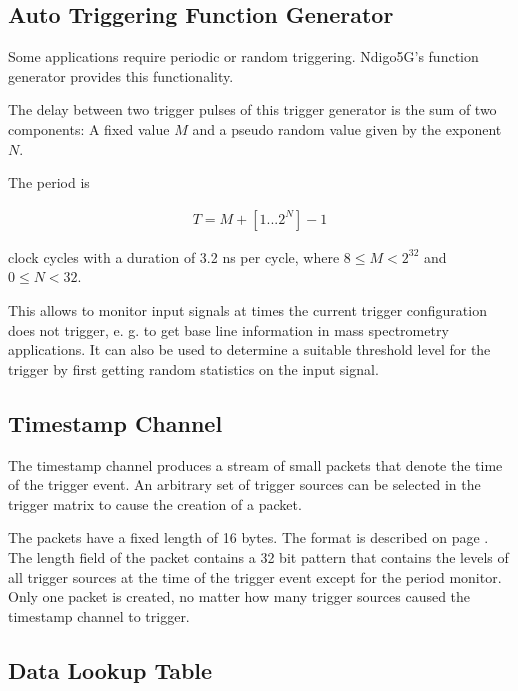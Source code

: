     \subsection{Auto Triggering Function Generator\label{cp:AutoTriggeringFunctionGenerator}}
    
        Some applications require periodic or random triggering. Ndigo5G's function generator provides this functionality.\par

        The delay between two trigger pulses of this trigger generator is the sum of two components: A fixed value $M$ and a pseudo random value given by the exponent $N$. \par

        The period is

        \begin{align}
            T = M + [1...2^N] - 1
        \end{align}

        clock cycles with a duration of 3.2 ns per cycle, where $8 \leq M < 2^{32}$ and $0 \leq N < 32$.\par
        
        This allows to monitor input signals at times the current trigger configuration does not trigger, e. g. to get base line information in mass spectrometry applications. It can also be used to determine a suitable threshold level for the trigger by first getting random statistics on the input signal.	
    
    \subsection{Timestamp Channel}

        The timestamp channel produces a stream of small packets that denote the time of the trigger event. An arbitrary set of trigger sources can be selected in the trigger matrix to cause the creation of a packet.\par
        
        The packets have a fixed length of 16 bytes. The format is described on page \pageref{cp:packetformat}. The length field of the packet contains a 32 bit pattern that contains the levels of all trigger sources at the time of the trigger event except for the period monitor. Only one packet is created, no matter how many trigger sources caused the timestamp channel to trigger.	
    
    \subsection{Data Lookup Table}
    
